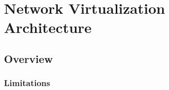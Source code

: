 \chapter{Network Virtualization Architecture}

\section{Overview}
\label{sec:Overview}

\subsection{Limitations}
\label{sec:Limitations}
